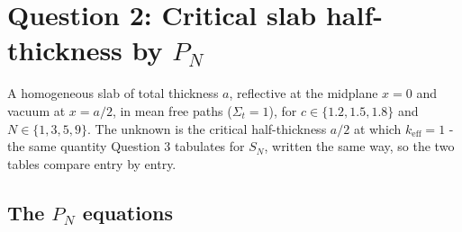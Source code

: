 \documentclass[11pt]{article}
\begin{document}
\FloatBarrier
\section*{Question 2: Critical slab half-thickness by $P_N$}

A homogeneous slab of total thickness $a$, reflective at the midplane $x=0$ and vacuum at
$x=a/2$, in mean free paths ($\Sigma_t=1$), for $c\in\{1.2,1.5,1.8\}$ and $N\in\{1,3,5,9\}$.
The unknown is the critical half-thickness $a/2$ at which $k_{\text{eff}}=1$ - the same
quantity Question 3 tabulates for $S_N$, written the same way, so the two tables compare entry
by entry.

\subsection*{The $P_N$ equations}
\end{document}
